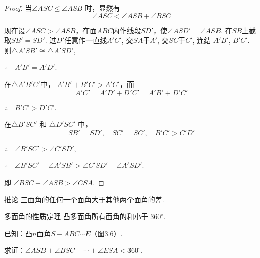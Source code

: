\begin{proof}
当$\angle ASC\le \angle ASB$ 时，显然有
\[
\angle ASC<\angle ASB+\angle BSC\]

现在设$\angle ASC>\angle ASB$，在面$ABC$内作线段$SD'$，使$\angle ASD' =\angle ASB$. 在$SB$上截取$SB' =SD'$. 过$D'$任意作一直线$A' C'$, 交$SA$于$A'$, 交$SC$于$ C' $, 连结 $A' B' $, $ B' C' $.
则$\triangle A' SB' \cong\triangle A' SD'$,

$\therefore\quad A' B' =A' D'$.

在$\triangle A' B' C'$中， $A' B' +B' C' >A' C' $，而
\[
A' C' =A' D' +D' C' =A' B' +D' C' 
\]

$\therefore\quad B' C' >D' C'$.

在$\triangle B' SC'$  和 $\triangle D' SC'$  中，
\[SB' =SD' ,\quad SC' =SC' ,\quad B' C' >C' D'\]

$\therefore\quad \angle B' SC' >\angle C' SD' $,

$\therefore\quad \angle B' SC' +\angle A' SB' >\angle C' SD' +\angle A' SD' $.

即 $\angle BSC+\angle ASB>\angle CSA$.
\end{proof}

\begin{thm}
{推论} 三面角的任何一个面角大于其他两个面角的差.
\end{thm}

\begin{thm}
{多面角的性质定理} 凸多面角所有面角的和小于 $360^{\circ}$.
\end{thm}

已知：凸$n$面角$S-ABC\cdots E$（图3.6）.

\begin{figure}[htp]
    \centering
{}
    \caption{}
\end{figure}

求证：$\angle ASB+\angle BSC+ \cdots +\angle ESA<360^{\circ}$.

